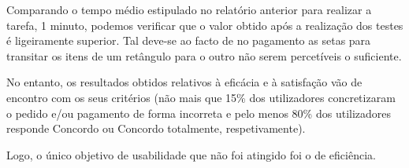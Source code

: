 \documentclass{article}
\begin{document}
Comparando o tempo médio estipulado no relatório anterior para realizar a tarefa, 1 minuto, podemos verificar que o valor obtido após a realização dos testes é ligeiramente superior. Tal deve-se ao facto de no pagamento as setas para transitar os itens de um retângulo para o outro não serem percetíveis o suficiente.

No entanto, os resultados obtidos relativos à eficácia e à satisfação vão de encontro com os seus critérios (não mais que 15\% dos utilizadores concretizaram o pedido e/ou pagamento de forma incorreta e pelo menos 80\% dos utilizadores responde Concordo ou Concordo totalmente, respetivamente).

Logo, o único objetivo de usabilidade que não foi atingido foi o de eficiência.
\end{document}
